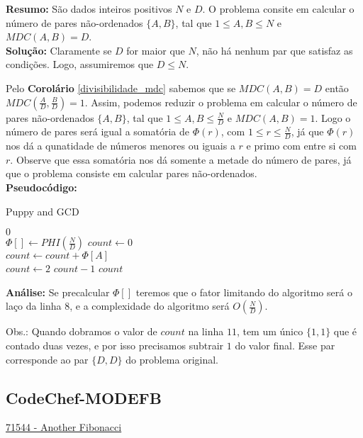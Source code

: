 \textbf{Resumo:}
São dados inteiros positivos $N$ e $D$. O problema consite em calcular o número de pares não-ordenados $\{A,B\}$, tal que $1\leq A,B \leq N$ e $MDC(A,B)=D$.
\\

\textbf{Solução:}
Claramente se $D$ for maior que $N$, não há nenhum par que satisfaz as condições. Logo, assumiremos que $D \leq N$.

Pelo \textbf{Corolário} \autoref{divisibilidade_mdc} sabemos que se $MDC(A,B)=D$ então $MDC(\frac{A}{D}, \frac{B}{D})=1$. Assim, podemos reduzir o problema
em calcular o número de pares não-ordenados $\{A,B\}$, tal que $1\leq A,B \leq \frac{N}{D}$ e $MDC(A,B)=1$.
Logo o número de pares será igual a somatória de $\Phi(r)$, com $1 \leq r \leq \frac{N}{D}$, já que $\Phi(r)$ nos dá a qunatidade de números menores ou iguais a $r$ e primo com entre si com $r$. Observe que essa somatória nos dá somente a metade do número de pares, já que o problema consiste em calcular pares não-ordenados.
\\

\textbf{Pseudocódigo:}
\begin{algorithm}
\caption{Puppy and GCD}
\begin{algorithmic}[1]
\State \Return $0$
\EndIf
\\
\State $\Phi[] \gets PHI(\frac{N}{D})$
\State $count \gets 0$
\\
\State $count \gets count + \Phi[A]$
\EndFor
\\
\State $count \gets 2$ $count - 1$
\State \Return $count$
\EndProcedure
\end{algorithmic}
\end{algorithm}

\textbf{Análise:}
Se precalcular $\Phi[]$ teremos que o fator limitando do algoritmo será o laço da linha $8$, e a complexidade do algoritmo será $O(\frac{N}{D})$.

Obs.: Quando dobramos o valor de $count$ na linha $11$, tem um único $\{1,1\}$ que é contado duas vezes, e por isso precisamos subtrair $1$ do valor final. 
Esse par corresponde ao par $\{D,D\}$ do problema original.




\subsection{CodeChef-MODEFB}
\href{https://www.codechef.com/problems/MOREFB}{71544 - Another Fibonacci}\\

